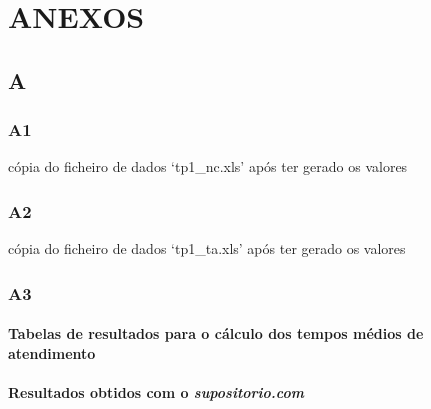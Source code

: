 \appendix

\part*{ANEXOS}

\chapter{A}
\section{A1}
\label{appendix:a}
\begin{longlisting}
	
	\caption{cópia do ficheiro de dados `tp1\_nc.xls' após ter gerado os valores}
	\label{listing:1}
\end{longlisting}
\section{A2}
\label{appendix:b}
\begin{longlisting}
	
	\caption{cópia do ficheiro de dados `tp1\_ta.xls' após ter gerado os valores}
	\label{listing:2}
\end{longlisting}
\section{A3}
\subsection{Tabelas de resultados para o cálculo dos tempos médios de atendimento }
\label{appendix:c1}

  
\newpage


\subsection{Resultados obtidos com o \emph{supositorio.com}}
\label{appendix:c2}















